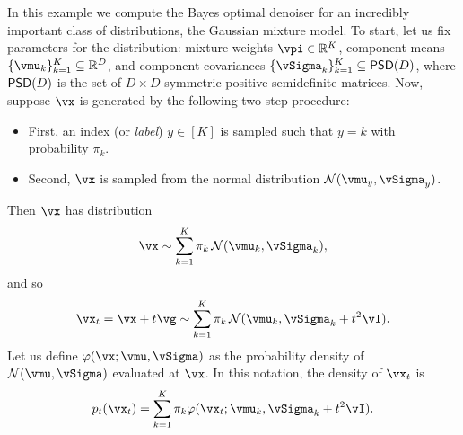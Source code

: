 \documentclass[../../book-main.tex]{subfiles}
\begin{document}
\begin{example}\label{example:denoising_gaussian_mixture}
	In this example we compute the Bayes optimal denoiser for an incredibly important class of distributions, the Gaussian mixture model. To start, let us fix parameters for the distribution: mixture weights \(\vpi \in \R^{K}\), component means \(\{\vmu_{k}\}_{k = 1}^{K} \subseteq \R^{D}\), and component covariances \(\{\vSigma_{k}\}_{k = 1}^{K} \subseteq \PSD(D)\), where  \(\mathsf{PSD}(D)\) is the set of \(D \times D\) symmetric positive semidefinite matrices. Now, suppose \(\vx\) is generated by the following two-step procedure:
	\begin{itemize}
		\item First, an index (or \textit{label}) \(y \in [K]\) is sampled such that \(y = k\) with probability \(\pi_{k}\).
		\item Second, \(\vx\) is sampled from the normal distribution \(\dNorm(\vmu_{y}, \vSigma_{y})\).
	\end{itemize}
	Then \(\vx\) has distribution
	\begin{equation}
		\vx \sim \sum_{k = 1}^{K}\pi_{k}\dNorm(\vmu_{k}, \vSigma_{k}),
	\end{equation}
	and so 
	\begin{equation}
		\vx_{t} = \vx + t\vg \sim \sum_{k = 1}^{K}\pi_{k}\dNorm(\vmu_{k}, \vSigma_{k} + t^{2}\vI).
	\end{equation}
	Let us define \(\phi(\vx ; \vmu, \vSigma)\) as the probability density of \(\dNorm(\vmu, \vSigma)\) evaluated at \(\vx\). In this notation, the density of \(\vx_{t}\) is 
	\begin{equation}
		p_{t}(\vx_{t}) = \sum_{k = 1}^{K}\pi_{k}\phi(\vx_{t} ; \vmu_{k}, \vSigma_{k} + t^{2}\vI).
	\end{equation}


\end{example}
\end{document}

